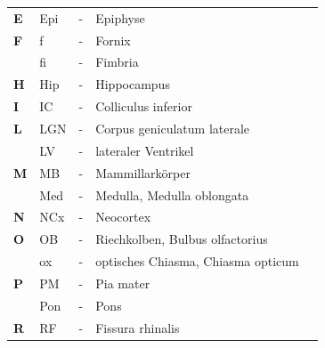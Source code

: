 \documentclass[12pt,a4paper,pdftex]{article}
\begin{document}
\begin{table}[H]
\begin{tabular}{llcll}
\textbf{E} & Epi & -          & Epiphyse                                                                &                               \\
\textbf{F} & f   & -          & Fornix                                                                  &                               \\
\textbf{}  & fi  & -          & Fimbria                                                                 &                               \\
\textbf{H} & Hip & -          & Hippocampus                                                             &                               \\
\textbf{I} & IC  & -          & Colliculus inferior                                                     &                               \\
\textbf{L} & LGN & -          & Corpus geniculatum laterale                                             &                               \\
\textbf{}  & LV  & -          & lateraler Ventrikel                                                     &                               \\
\textbf{M} & MB  & -          & Mammillarkörper                                                         &                               \\
\textbf{}  & Med & -          & Medulla, Medulla oblongata                  &                               \\
\textbf{N} & NCx & -          & Neocortex                                                               &                               \\
\textbf{O} & OB  & -          & Riechkolben, Bulbus olfactorius                                                      &                               \\
\textbf{}  & ox  & -          & optisches Chiasma, Chiasma opticum           &                               \\
\textbf{P} & PM  & -          & Pia mater                                                               &                               \\
\textbf{}  & Pon & -          & Pons                                                                    &                               \\
\textbf{R} & RF  & -          & Fissura rhinalis                                                        &                               \\

\end{tabular}
\end{table}
\end{document}
